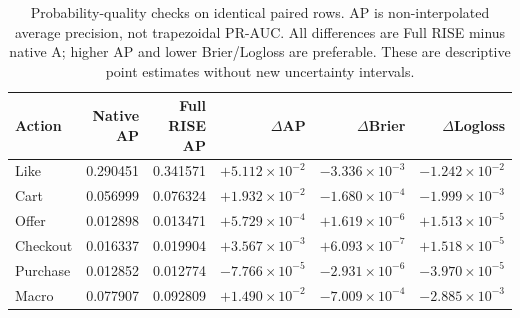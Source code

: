\begin{table}[t]
\centering\small\setlength{\tabcolsep}{4pt}
\caption{Probability-quality checks on identical paired rows. AP is
non-interpolated average precision, not trapezoidal PR-AUC. All differences are
Full RISE minus native A; higher AP and lower Brier/Logloss are preferable.
These are descriptive point estimates without new uncertainty intervals.}
\label{tab:native_prediction_quality}
\begin{tabular}{lrrrrr}\toprule
Action & Native AP & Full RISE AP & $\Delta$AP & $\Delta$Brier & $\Delta$Logloss \\
\midrule
Like & 0.290451 & 0.341571 & $+5.112\times10^{-2}$ & $-3.336\times10^{-3}$ & $-1.242\times10^{-2}$ \\
Cart & 0.056999 & 0.076324 & $+1.932\times10^{-2}$ & $-1.680\times10^{-4}$ & $-1.999\times10^{-3}$ \\
Offer & 0.012898 & 0.013471 & $+5.729\times10^{-4}$ & $+1.619\times10^{-6}$ & $+1.513\times10^{-5}$ \\
Checkout & 0.016337 & 0.019904 & $+3.567\times10^{-3}$ & $+6.093\times10^{-7}$ & $+1.518\times10^{-5}$ \\
Purchase & 0.012852 & 0.012774 & $-7.766\times10^{-5}$ & $-2.931\times10^{-6}$ & $-3.970\times10^{-5}$ \\
Macro & 0.077907 & 0.092809 & $+1.490\times10^{-2}$ & $-7.009\times10^{-4}$ & $-2.885\times10^{-3}$ \\
\bottomrule\end{tabular}
\end{table}
